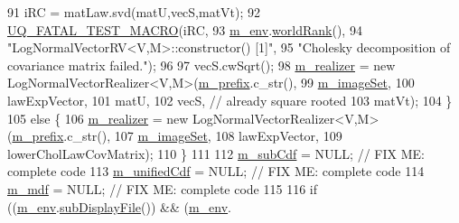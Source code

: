 \begin{DoxyCode}
91     iRC = matLaw.svd(matU,vecS,matVt);
92     \hyperlink{_defines_8h_a56d63d18d0a6d45757de47fcc06f574d}{UQ\_FATAL\_TEST\_MACRO}(iRC,
93                         \hyperlink{class_q_u_e_s_o_1_1_base_vector_r_v_a556761c50e2d171977ef5f19a63c8c73}{m\_env}.\hyperlink{class_q_u_e_s_o_1_1_base_environment_a78b57112bbd0e6dd0e8afec00b40ffa7}{worldRank}(),
94                         \textcolor{stringliteral}{"LogNormalVectorRV<V,M>::constructor() [1]"},
95                         \textcolor{stringliteral}{"Cholesky decomposition of covariance matrix failed."});
96 
97     vecS.cwSqrt();
98     \hyperlink{class_q_u_e_s_o_1_1_base_vector_r_v_ad99bc05293c0fd0a0accb3191fb7119e}{m\_realizer} = \textcolor{keyword}{new} LogNormalVectorRealizer<V,M>(\hyperlink{class_q_u_e_s_o_1_1_base_vector_r_v_a030ce3bc9873a9eaf6d8bf452c096ab3}{m\_prefix}.c\_str(),
99                                                          \hyperlink{class_q_u_e_s_o_1_1_base_vector_r_v_ad31872bb4da22d47528cb9d691b3b7ff}{m\_imageSet},
100                                                          lawExpVector,
101                                                          matU,
102                                                          vecS, \textcolor{comment}{// already square rooted}
103                                                          matVt);
104   \}
105   \textcolor{keywordflow}{else} \{
106     \hyperlink{class_q_u_e_s_o_1_1_base_vector_r_v_ad99bc05293c0fd0a0accb3191fb7119e}{m\_realizer} = \textcolor{keyword}{new} LogNormalVectorRealizer<V,M>(\hyperlink{class_q_u_e_s_o_1_1_base_vector_r_v_a030ce3bc9873a9eaf6d8bf452c096ab3}{m\_prefix}.c\_str(),
107                                                         \hyperlink{class_q_u_e_s_o_1_1_base_vector_r_v_ad31872bb4da22d47528cb9d691b3b7ff}{m\_imageSet},
108                                                         lawExpVector,
109                                                         lowerCholLawCovMatrix);
110   \}
111 
112   \hyperlink{class_q_u_e_s_o_1_1_base_vector_r_v_a1a1117671c7fa2e572a9484463bee3a5}{m\_subCdf}     = NULL; \textcolor{comment}{// FIX ME: complete code}
113   \hyperlink{class_q_u_e_s_o_1_1_base_vector_r_v_a31a1d44bbb6a7c030ca31a9577904252}{m\_unifiedCdf} = NULL; \textcolor{comment}{// FIX ME: complete code}
114   \hyperlink{class_q_u_e_s_o_1_1_base_vector_r_v_a5a95d0107f66cf9b0ed3ad18a3d738df}{m\_mdf}        = NULL; \textcolor{comment}{// FIX ME: complete code}
115 
116   \textcolor{keywordflow}{if} ((\hyperlink{class_q_u_e_s_o_1_1_base_vector_r_v_a556761c50e2d171977ef5f19a63c8c73}{m\_env}.\hyperlink{class_q_u_e_s_o_1_1_base_environment_a8a0064746ae8dddfece4229b9ad374d6}{subDisplayFile}()) && (\hyperlink{class_q_u_e_s_o_1_1_base_vector_r_v_a556761c50e2d171977ef5f19a63c8c73}{m\_env}.

\end{DoxyCode}
